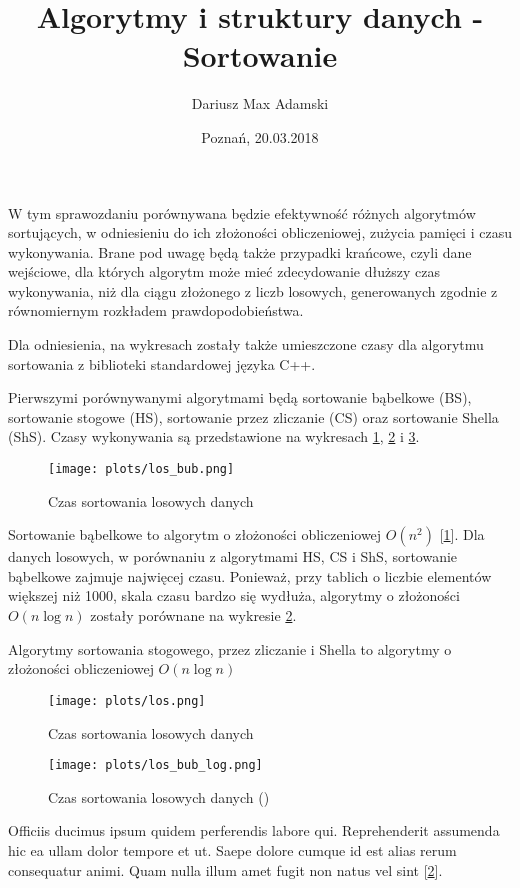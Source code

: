 \documentclass[10pt,twocolumn]{article}
\title{Algorytmy i struktury danych - Sortowanie}
\author{Dariusz Max Adamski}
\date{Poznań, 20.03.2018}
\begin{document}
\maketitle

W tym sprawozdaniu porównywana będzie efektywność różnych algorytmów sortujących, w odniesieniu do ich złożoności obliczeniowej, zużycia pamięci i czasu wykonywania. Brane pod uwagę będą także przypadki krańcowe, czyli dane wejściowe, dla których algorytm może mieć zdecydowanie dłuższy czas wykonywania, niż dla ciągu złożonego z liczb losowych, generowanych zgodnie z równomiernym rozkładem prawdopodobieństwa.

Dla odniesienia, na wykresach zostały także umieszczone czasy dla algorytmu sortowania z biblioteki standardowej języka C++.

Pierwszymi porównywanymi algorytmami będą sortowanie bąbelkowe (BS), sortowanie stogowe (HS), sortowanie przez zliczanie (CS) oraz sortowanie Shella (ShS). Czasy wykonywania są przedstawione na wykresach \ref{los_bub}, \ref{los} i \ref{los_bub_log}.

\begin{figure}[h!]
	\texttt{[image: plots/los\_bub.png]}
	\caption{Czas sortowania losowych danych \label{los_bub}}
\end{figure}

Sortowanie bąbelkowe to algorytm o złożoności obliczeniowej $O(n^2)$ [\ref{los_bub}]. Dla danych losowych, w porównaniu z algorytmami HS, CS i ShS, sortowanie bąbelkowe zajmuje najwięcej czasu. Ponieważ, przy tablich o liczbie elementów większej niż 1000, skala czasu bardzo się wydłuża, algorytmy o złożoności $O(n \log n)$ zostały porównane na wykresie \ref{los}.

Algorytmy sortowania stogowego, przez zliczanie i Shella to algorytmy o złożoności obliczeniowej $O(n \log n)$

\begin{figure}[h!]
	\texttt{[image: plots/los.png]}
	\caption{Czas sortowania losowych danych \label{los}}
\end{figure}

\begin{figure}[h!]
	\texttt{[image: plots/los\_bub\_log.png]}
	\caption{Czas sortowania losowych danych ()\label{los_bub_log}}
\end{figure}

Officiis ducimus ipsum quidem perferendis labore qui. Reprehenderit assumenda hic ea ullam dolor tempore et ut. Saepe dolore cumque id est alias rerum consequatur animi. Quam nulla illum amet fugit non natus vel sint [\ref{los}].
\end{document}
